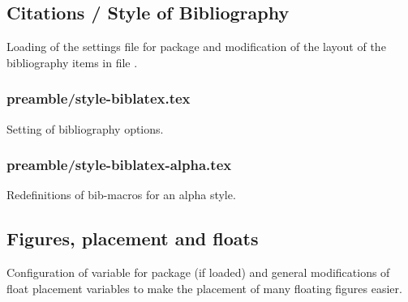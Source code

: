 
\subsection{Citations / Style of Bibliography}
\label{sec:style:bib}

Loading of the settings file  for package  and modification of the layout of the bibliography items in file .


\subsubsection{preamble/style-biblatex.tex}

Setting of bibliography options.


\subsubsection{preamble/style-biblatex-alpha.tex}

Redefinitions of bib-macros for an alpha style.


\subsection{Figures, placement and floats}
\label{sec:style:figures}

Configuration of variable for package  (if loaded) and 
general modifications of float placement variables to make the placement of 
many floating figures easier.


